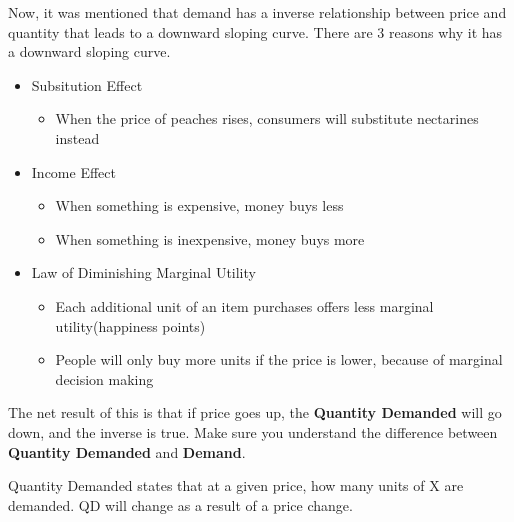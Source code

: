 Now, it was mentioned that demand has a inverse relationship between price and quantity that leads to a downward sloping curve. There are 3 reasons why it has a downward sloping curve. 
\begin{itemize}
    \item Subsitution Effect
        \begin{itemize}
            \item When the price of peaches rises, consumers will substitute nectarines instead
        \end{itemize}
    \item Income Effect
        \begin{itemize}
            \item When something is expensive, money buys less
            \item When something is inexpensive, money buys more
        \end{itemize}
    \item Law of Diminishing Marginal Utility
        \begin{itemize}
            \item Each additional unit of an item purchases offers less marginal utility(happiness points)
            \item People will only buy more units if the price is lower, because of marginal decision making
        \end{itemize}
\end{itemize}
The net result of this is that if price goes up, the \textbf{Quantity Demanded} will go down, and the inverse is true. Make sure you understand the difference between \textbf{Quantity Demanded} and \textbf{Demand}.
\begin{definition}
    Quantity Demanded states that at a given price, how many units of X are demanded. QD will change as a result of a price change. 
\end{definition}

